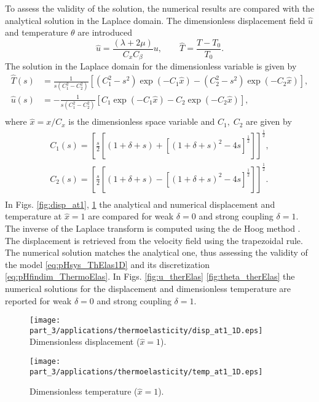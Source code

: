 To assess the validity of the solution, the numerical results are compared with the analytical solution in the Laplace domain. The dimensionless displacement field $\widehat{u}$ and temperature $\theta$ are introduced
$$\widehat{u} = \frac{(\lambda + 2\mu)}{C_x {C}_\beta} u,  \qquad \widehat{T} = \frac{T-T_0}{T_0}.$$
The solution in the Laplace domain for the dimensionless variable is given by \cite{balla1991}
\begin{equation}
\begin{aligned}
\widehat{T}(s) &= \frac{1}{s(C_1^2 - C_2^2)}[(C_1^2- s^2)\exp(-C_1 \widehat{x}) - (C_2^2 - s^2)\exp(-C_2 \widehat{x})], \\
\widehat{u}(s) &= -\frac{1}{s(C_1^2 - C_2^2)}[C_1\exp(-C_1 \widehat{x}) - C_2\exp(-C_2 \widehat{x})], \\
\end{aligned}
\end{equation}
where $\widehat{x} = x/C_x$ is the dimensionless space variable and $C_1, \; C_2$ are given by
\begin{equation}
\begin{aligned}
C_1(s) = \left[\frac{s}{2} [(1+\delta+s)+[(1+\delta+s)^2-4s]^{\frac{1}{2}} ]\right]^{\frac{1}{2}}, \\
C_2(s) = \left[\frac{s}{2} [(1+\delta+s)-[(1+\delta+s)^2-4s]^{\frac{1}{2}} ]\right]^{\frac{1}{2}}. \\
\end{aligned}
\end{equation}
In Figs. \ref{fig:disp_at1}, \ref{fig:temp_at1} the analytical and numerical displacement and temperature at $\widehat{x}=1$ are compared for weak $\delta=0$ and strong coupling $\delta=1$. The inverse of the Laplace transform is computed using the de Hoog method \cite{dehoog1982}. The displacement is retrieved from the velocity field using the trapezoidal rule. The numerical solution matches the analytical one, thus assessing the validity of the model \eqref{eq:pHsys_ThElas1D} and its discretization \eqref{eq:pHfindim_ThermoElas}. In Figs. \ref{fig:u_therElas} \ref{fig:theta_therElas} the numerical solutions for the displacement and dimensionless temperature are reported for weak $\delta=0$ and strong coupling $\delta=1$.


\begin{figure}[htbp]
	\begin{minipage}[t]{0.48\linewidth}
		\centering
		\texttt{[image: part\_3/applications/thermoelasticity/disp\_at1\_1D.eps]} \\
		\caption{Dimensionless displacement ($\widehat{x} = 1$).}
		\label{fig:disp_at1}
	\end{minipage}
	\hspace{0.5cm}
	\begin{minipage}[t]{0.48\linewidth}
		\centering
		\texttt{[image: part\_3/applications/thermoelasticity/temp\_at1\_1D.eps]}
		\caption{Dimensionless temperature ($\widehat{x} = 1$).}
		\label{fig:temp_at1}
	\end{minipage}
\end{figure}


